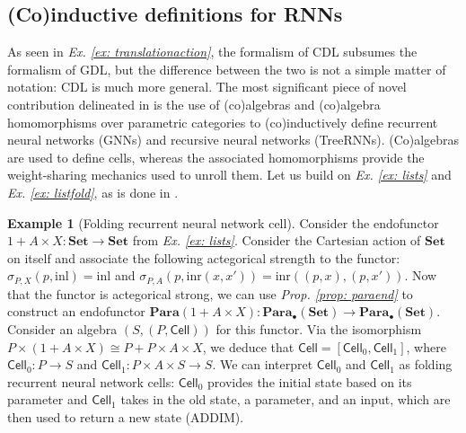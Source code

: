 \documentclass[11pt,a4paper,openright,twoside]{report}
\newcounter{mycounter}
\theoremstyle{plain}
\theoremstyle{definition}
\newtheorem{example}[mycounter]{Example}
\begin{document}
\subsection{(Co)inductive definitions for RNNs}

As seen in \textit{Ex. \ref{ex: translationaction}}, the formalism of CDL subsumes the formalism of GDL, but the difference between the two is not a simple matter of notation: CDL is much more general. The most significant piece of novel contribution delineated in \cite{gavranovicposition} is the use of (co)algebras and (co)algebra homomorphisms over parametric categories to (co)inductively define recurrent neural networks (GNNs) and recursive neural networks (TreeRNNs). (Co)algebras are used to define cells, whereas the associated homomorphisms provide the weight-sharing mechanics used to unroll them. Let us build on \textit{Ex. \ref{ex: lists}} and \textit{Ex. \ref{ex: listfold}}, as is done in \cite{gavranovicposition}.

\begin{example}[Folding recurrent neural network cell]
  \label{ex: frnncell}
  Consider the endofunctor $1 + A \times X: \mathbf{Set} \to \mathbf{Set}$ from \textit{Ex. \ref{ex: lists}}. Consider the Cartesian action of $\mathbf{Set}$ on itself and associate the following actegorical strength to the functor: $\sigma_{P,X}(p,\mathrm{inl}) = \mathrm{inl}$ and  $\sigma_{P,A}(p,\mathrm{inr}(x,x')) = \mathrm{inr}((p,x), (p,x'))$. Now that the functor is actegorical strong, we can use \textit{Prop. \ref{prop: paraend}} to construct an endofunctor $\mathbf{Para}(1 + A \times X): \mathbf{Para}_{\bullet}(\mathbf{Set}) \to \mathbf{Para}_{\bullet}(\mathbf{Set})$. Consider an algebra $(S,(P,\mathsf{Cell}))$ for this functor. Via the isomorphism $P \times (1 + A \times X) \cong P + P \times A \times X$, we deduce that $\mathsf{Cell} = [\mathsf{Cell}_0, \mathsf{Cell}_1]$, where $\mathsf{Cell}_0: P \to S$ and  $\mathsf{Cell}_1: P \times A \times S \to S$. We can interpret $\mathsf{Cell}_0$ and $\mathsf{Cell}_1$ as folding recurrent neural network cells: $\mathsf{Cell}_0$ provides the initial state based on its parameter and $\mathsf{Cell}_1$ takes in the old state, a parameter, and an input, which are then used to return a new state (ADDIM).
\end{example}
\end{document}

